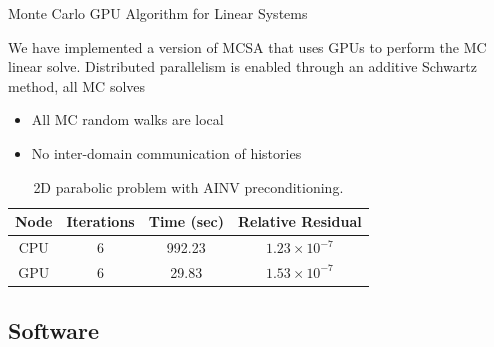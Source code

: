 \documentclass{beamer}
\begin{document}

\begin{frame}{Monte Carlo GPU Algorithm for Linear Systems}

  We have implemented a version of MCSA that uses GPUs to perform the MC
  linear solve.
  \vfill
  Distributed parallelism is enabled through an additive Schwartz method, all
  MC solves
  \begin{itemize}
  \item All MC random walks are local
  \item No inter-domain communication of histories
  \end{itemize}

  \begin{table}[h]
    \begin{center}
      \caption{2D parabolic problem with AINV preconditioning.}
      \begin{tabular}{|c|c|c|c|}\hline
        Node & Iterations & Time (sec) & Relative Residual \\\hline
        CPU & 6 & 992.23 & $1.23\times 10^{-7}$ \\\hline
        GPU & 6 & 29.83 & $1.53\times 10^{-7}$ \\\hline
      \end{tabular}
    \end{center}
  \end{table}

\end{frame}

\subsection{Software}
\end{document}

